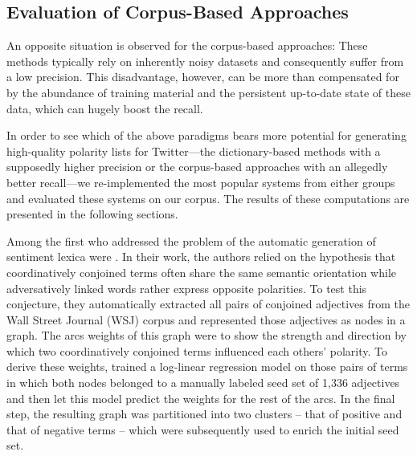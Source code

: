 
\subsection{Evaluation of Corpus-Based Approaches}

An opposite situation is observed for the corpus-based approaches:
These methods typically rely on inherently noisy datasets and
consequently suffer from a low precision.  This disadvantage, however,
can be more than compensated for by the abundance of training material
and the persistent up-to-date state of these data, which can hugely
boost the recall.

In order to see which of the above paradigms bears more potential for
generating high-quality polarity lists for Twitter---the
dictionary-based methods with a supposedly higher precision or the
corpus-based approaches with an allegedly better recall---we
re-implemented the most popular systems from either groups and
evaluated these systems on our corpus.  The results of these
computations are presented in the following sections.

Among the first who addressed the problem of the automatic generation
of sentiment lexica were \citet{Hatzivassi:97}.  In their work, the
authors relied on the hypothesis that coordinatively conjoined terms
often share the same semantic orientation while adversatively linked
words rather express opposite polarities.  To test this conjecture,
they automatically extracted all pairs of conjoined adjectives from
the Wall Street Journal (WSJ) corpus and represented those adjectives
as nodes in a graph.  The arcs weights of this graph were to show the
strength and direction by which two coordinatively conjoined terms
influenced each others' polarity.  To derive these weights,
\citeauthor{Hatzivassi:97} trained a log-linear regression model on
those pairs of terms in which both nodes belonged to a manually
labeled seed set of 1,336 adjectives and then let this model predict
the weights for the rest of the arcs.  In the final step, the
resulting graph was partitioned into two clusters -- that of positive
and that of negative terms -- which were subsequently used to enrich
the initial seed set.


